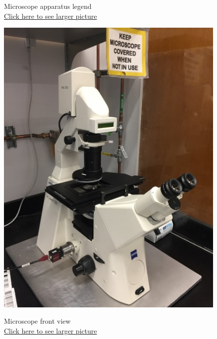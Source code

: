 \documentclass{../lab}
\begin{document}
\begin{figure}[H]
  \caption{Microscope apparatus legend \\
  \href{http://experimentationlab.berkeley.edu/sites/default/files/upimages/2_Legend-Microscope_2540.JPG}{Click here to see larger picture}}
  \label{fig:MicroscopeLegend}
\endminipage\hfill
{}
  \href{http://experimentationlab.berkeley.edu/sites/default/files/upimages/1_Microscope_2539.JPG}{\includegraphics[width=\linewidth,keepaspectratio]{images/1_Microscope_2539.JPG}}
  \caption{Microscope front view\\ \href{http://experimentationlab.berkeley.edu/sites/default/files/upimages/1_Microscope_2539.JPG}{Click here to see larger picture}}\label{fig:Microscope}
\endminipage
\end{figure}
\end{document}
